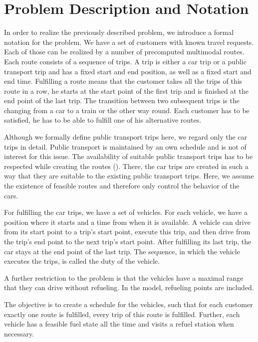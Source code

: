 
\section{Problem Description and Notation}
\label{sec:problem_description}

In order to realize the previously described problem, we introduce a formal notation for the problem. We have a set of customers with known travel requests. Each of those can be realized by a number of precomputed multimodal routes. Each route consists of a sequence of trips. A trip is either a car trip or a public transport trip and has a fixed start and end position, as well as a fixed start and end time. Fulfilling a route means that the customer takes all the trips of this route in a row, \ie he starts at the start point of the first trip and is finished at the end point of the last trip. The transition between two subsequent trips is the changing from a car to a train or the other way round. Each customer has to be satisfied, \ie he has to be able to fulfill one of his alternative routes.

Although we formally define public transport trips here, we regard only the car trips in detail. Public transport is maintained by an own schedule and is not of interest for this issue. The availability of suitable public transport trips has to be respected while creating the routes (). There, the car trips are created in such a way that they are suitable to the existing public transport trips. Here, we assume the existence of feasible routes and therefore only control the behavior of the cars.

For fulfilling the car trips, we have a set of vehicles. For each vehicle, we have a position where it starts and a time from when it is available. A vehicle can drive from its start point to a trip's start point, execute this trip, and then drive from the trip's end point to the next trip's start point. After fulfilling its last trip, the car stays at the end point of the last trip. The sequence, in which the vehicle executes the trips, is called the duty of the vehicle. 

A further restriction to the problem is that the vehicles have a maximal range that they can drive without refueling. In the model, refueling points are included.

The objective is to create a schedule for the vehicles, such that for each customer exactly one route is fulfilled, \ie every trip of this route is fulfilled. Further, each vehicle has a feasible fuel state all the time and visits a refuel station when necessary.

